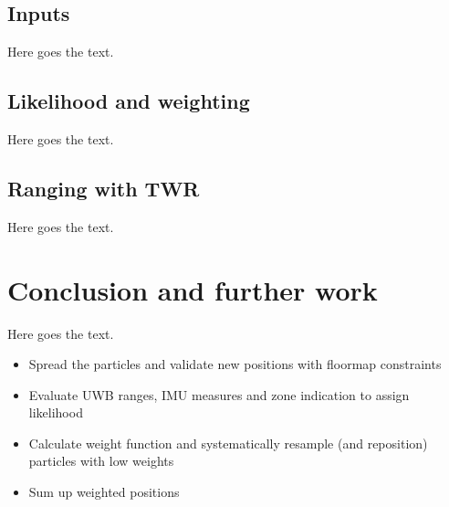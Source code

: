 \subsection{Inputs}
Here goes the text.



\subsection{Likelihood and weighting}
Here goes the text.


\subsection{Ranging with TWR}
Here goes the text.




\section{Conclusion and further work}
Here goes the text.
\begin{itemize}
\item Spread the particles and validate new positions with floormap constraints
\item Evaluate UWB ranges, IMU measures and zone indication to assign likelihood
\item Calculate weight function and systematically resample (and reposition) particles with low weights
\item Sum up weighted positions
\end{itemize}
